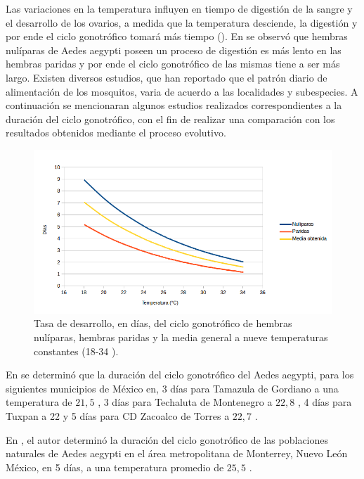 Las variaciones en la temperatura influyen en tiempo de digestión de la sangre y el
desarrollo de los ovarios, a medida que la temperatura desciende, la digestión y por ende el ciclo
gonotrófico tomará más tiempo (). En \cite{edman1987host}
se observó que hembras nulíparas de Aedes aegypti poseen un proceso de digestión es más lento en
las hembras paridas y por ende el ciclo gonotrófico de las mismas tiene a ser más largo. Existen
diversos estudios, que han reportado que el patrón diario de alimentación de los mosquitos, varia
de acuerdo a las localidades y subespecies. A continuación se mencionaran algunos estudios
realizados correspondientes a la duración del ciclo gonotrófico, con el fin de realizar una
comparación con los resultados obtenidos mediante el proceso evolutivo.

\begin{figure}[!htbp]
    \centering
    \includegraphics[width=1\textwidth]{capitulo-6/graphics/ciclo-gonotrofico-temperatura.png}
    \caption{\label{fig:ciclo-gonotrofico-temperatura} Tasa de desarrollo, en días, del ciclo
    gonotrófico de hembras nulíparas, hembras paridas y la media general a nueve temperaturas
    constantes (18-34 \textcelsius).}
\end{figure}

En \cite{beltran2001bionomia} se determinó que la duración del ciclo gonotrófico del Aedes
aegypti, para los siguientes municipios de México en, 3 días para Tamazula de Gordiano a una
temperatura de $21,5$ \textcelsius, 3 días para Techaluta de Montenegro a $22,8$ \textcelsius, 4
días para Tuxpan a 22 \textcelsius y 5 días para CD Zacoalco de Torres a $22,7$ \textcelsius.

En \cite{luevano1993ciclo}, el autor determinó la duración del ciclo gonotrófico de las
poblaciones naturales de Aedes aegypti en el área metropolitana de Monterrey, Nuevo León México,
en 5 días, a una temperatura promedio de $25,5$ \textcelsius.

